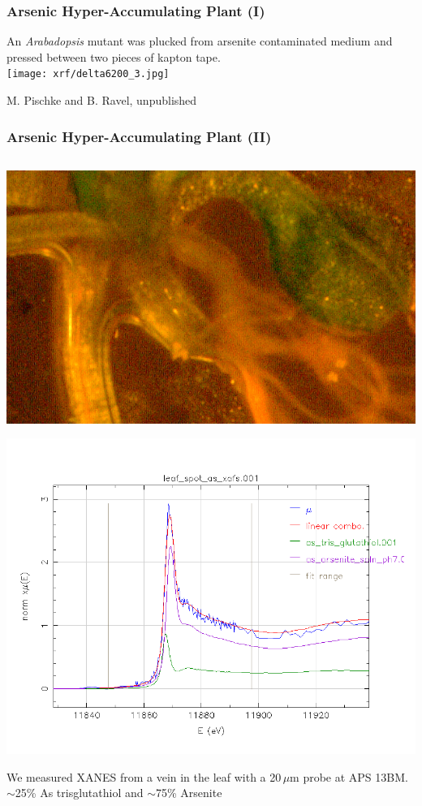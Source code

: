 \documentclass[10pt, xcolor=x11names, compress]{beamer}
\begin{document}
\begin{frame}
  \frametitle{Arsenic Hyper-Accumulating Plant (I)}

  \begin{center}
    An \textit{Arabadopsis} mutant was plucked from arsenite
    contaminated medium and pressed between two pieces of kapton
    tape.\\[1ex]
    \texttt{[image: xrf/delta6200\_3.jpg]}
  \end{center}
  \begin{bottomnote}[0.5][20]
    M. Pischke and B. Ravel, unpublished
  \end{bottomnote}
\end{frame}
\begin{frame}
  \frametitle{Arsenic Hyper-Accumulating Plant (II)}

  \begin{columns}[T]
    \begin{column}{0.6\linewidth}
      \qquad\includegraphics[width=0.65\linewidth]{xrf/arabadopsis_sm.png}

      \quad\includegraphics[width=0.7\linewidth]{xrf/arabadopsis_xanes.png}

      \small We measured XANES from a vein in the leaf with a
      20\,$\mu$m probe at APS 13BM.\\
      {\color{Green4}$\sim$25\% As trisglutathiol} and
      {\color{Purple4}$\sim$75\% Arsenite}


\end{column}
\end{columns}
\end{frame}
\end{document}
